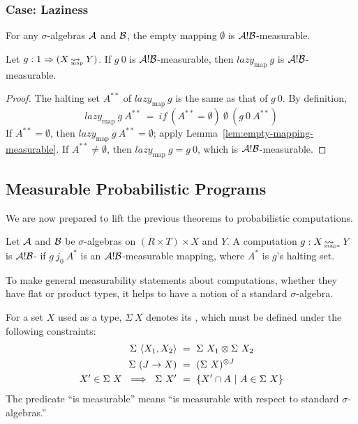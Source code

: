 \documentclass[preprint]{sigplanconf}
\newcommand{\arrow}{\rightsquigarrow}
\newcommand{\arrowlazy}{\ensuremath{lazy}}
\newcommand{\map}{_\mathrm{map}}
\DeclareMathOperator{\mapto}{\arrow_{\mspace{-21mu}\map}}
\newcommand{\lazymap}{\arrowlazy\map}
\DeclareMathOperator{\pmapto}{\arrow_{\mspace{-22mu}_{\mathrm{map*}}}}
\begin{document}
\subsubsection{Case: Laziness}

\begin{lemma}
For any $\sigma$-algebras $\mathcal{A}$ and $\mathcal{B}$, the empty mapping $\emptyset$ is $\mathcal{A}!\mathcal{B}$-measurable.
\label{lem:empty-mapping-measurable}
\end{lemma}

\begin{theorem}[measurability under $\lazymap$]
Let $g : 1 \tto (X \mapto Y)$. If $g~0$ is $\mathcal{A}!\mathcal{B}$-measurable, then $\lazymap~g$ is $\mathcal{A}!\mathcal{B}$-measurable.
\end{theorem}
\begin{proof}
The halting set $A^{**}$ of $\lazymap~g$ is the same as that of $g~0$.
By definition,
\begin{equation}
	\lazymap~g~A^{**} \ = \ if~(A^{**} = \emptyset)~\emptyset~(g~0~A^{**})
\end{equation}
If $A^{**} = \emptyset$, then $\lazymap~g~A^{**} = \emptyset$; apply Lemma~\ref{lem:empty-mapping-measurable}.
If $A^{**} \neq \emptyset$, then $\lazymap~g = g~0$, which is $\mathcal{A}!\mathcal{B}$-measurable.
\end{proof}

\subsection{Measurable Probabilistic Programs}

We are now prepared to lift the previous theorems to probabilistic computations.

\begin{definition}
Let $\mathcal{A}$ and $\mathcal{B}$ be $\sigma$-algebras on $(R \times T) \times X$ and $Y$.
A computation $g : X \pmapto Y$ is $\mathcal{A}!\mathcal{B}$- if $g~j_0~A^*$ is an $\mathcal{A}!\mathcal{B}$-measurable mapping, where $A^*$ is $g$'s halting set.
\end{definition}

To make general measurability statements about computations, whether they have flat or product types, it helps to have a notion of a standard $\sigma$-algebra.

\begin{definition}
For a set $X$ used as a type, $\Sigma~X$ denotes its , which must be defined under the following constraints:
\begin{align}
	\Sigma~\langle{X_1,X_2}\rangle &\ = \ \Sigma~X_1 \otimes \Sigma~X_2
	\label{eqn:standard-finite-product-rule}
\\
	\Sigma~(J \to X) &\ = \ (\Sigma~X)^{\otimes J}
	\label{eqn:standard-arbitrary-product-rule}
\\
	X' \in \Sigma~X \ \implies \ \Sigma~X' &\ =\ \lbrace {X' \cap A} \ \lvert\ {A \in \Sigma~X} \rbrace
	\label{eqn:standard-subset-rule}
\end{align}
The predicate ``is measurable'' means ``is measurable with respect to standard $\sigma$-algebras.''
\label{def:standard-sigma-algebra}
\end{definition}
\end{document}
